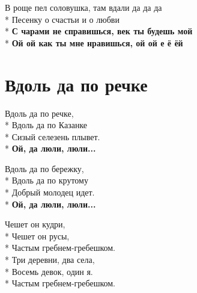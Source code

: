 \medskip

\begin{minipage}{\linewidth}
В роще пел соловушка, там вдали да да да\\*
Песенку о счастьи и о любви\\*
\textbf{С чарами не справишься, век ты будешь мой}\\*
\textbf{Ой ой как ты мне нравишься, ой ой е ё ёй}\\
\end{minipage}

\vspace{\fill}\newpage

\section{Вдоль да по речке}
\label{song:Вдоль_да_по_речке}

\medskip

\begin{minipage}{\linewidth}
Вдоль да по речке,\\*
Вдоль да по Казанке\\*
Сизый селезень плывет.\\*
\textbf{Ой, да люли, люли...}\\
\end{minipage}\par\medskip\nobreak

\medskip

\begin{minipage}{\linewidth}
Вдоль да по бережку,\\*
Вдоль да по крутому\\*
Добрый молодец идет.\\*
\textbf{Ой, да люли, люли...}\\
\end{minipage}\par\medskip\nobreak

\medskip

\begin{minipage}{\linewidth}
Чешет он кудри,\\*
Чешет он русы,\\*
Частым гребнем-гребешком.\\*
\hspace*{1.5em}Три деревни, два села,\\*
\hspace*{1.5em}Восемь девок, один я. \\*
\hspace*{1.5em}Частым гребнем-гребешком.\\
\end{minipage}\par\medskip\nobreak

